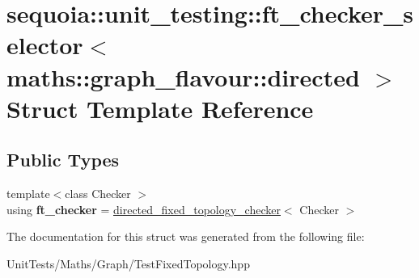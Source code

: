 \hypertarget{structsequoia_1_1unit__testing_1_1ft__checker__selector_3_01maths_1_1graph__flavour_1_1directed_01_4}{}\section{sequoia\+::unit\+\_\+testing\+::ft\+\_\+checker\+\_\+selector$<$ maths\+::graph\+\_\+flavour\+::directed $>$ Struct Template Reference}
\label{structsequoia_1_1unit__testing_1_1ft__checker__selector_3_01maths_1_1graph__flavour_1_1directed_01_4}
\subsection*{Public Types}
\begin{DoxyCompactItemize}
\item 
\mbox{\label{structsequoia_1_1unit__testing_1_1ft__checker__selector_3_01maths_1_1graph__flavour_1_1directed_01_4_a779f04951fd38630ad4d15119b9d6cdc}} 
{\footnotesize template$<$class Checker $>$ }\\using {\bfseries ft\+\_\+checker} = \mbox{\hyperlink{classsequoia_1_1unit__testing_1_1directed__fixed__topology__checker}{directed\+\_\+fixed\+\_\+topology\+\_\+checker}}$<$ Checker $>$
\end{DoxyCompactItemize}


The documentation for this struct was generated from the following file\+:\begin{DoxyCompactItemize}
\item 
Unit\+Tests/\+Maths/\+Graph/Test\+Fixed\+Topology.\+hpp\end{DoxyCompactItemize}
